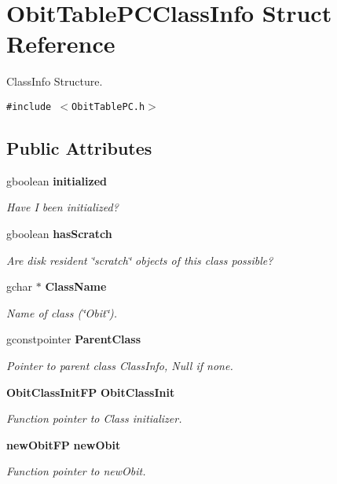 \section{Obit\-Table\-PCClass\-Info Struct Reference}
\label{structObitTablePCClassInfo}
Class\-Info Structure.  


{\tt \#include $<$Obit\-Table\-PC.h$>$}

\subsection*{Public Attributes}
\begin{CompactItemize}
\item 
gboolean {\bf initialized}
\begin{CompactList}\small\item\em Have I been initialized? \item\end{CompactList}\item 
gboolean {\bf has\-Scratch}
\begin{CompactList}\small\item\em Are disk resident \char`\"{}scratch\char`\"{} objects of this class possible? \item\end{CompactList}\item 
gchar $\ast$ {\bf Class\-Name}
\begin{CompactList}\small\item\em Name of class (\char`\"{}Obit\char`\"{}). \item\end{CompactList}\item 
gconstpointer {\bf Parent\-Class}
\begin{CompactList}\small\item\em Pointer to parent class Class\-Info, Null if none. \item\end{CompactList}\item 
{\bf Obit\-Class\-Init\-FP} {\bf Obit\-Class\-Init}
\begin{CompactList}\small\item\em Function pointer to Class initializer. \item\end{CompactList}\item 
{\bf new\-Obit\-FP} {\bf new\-Obit}
\begin{CompactList}\small\item\em Function pointer to new\-Obit. \item\end{CompactList}\item 

\end{CompactItemize}
